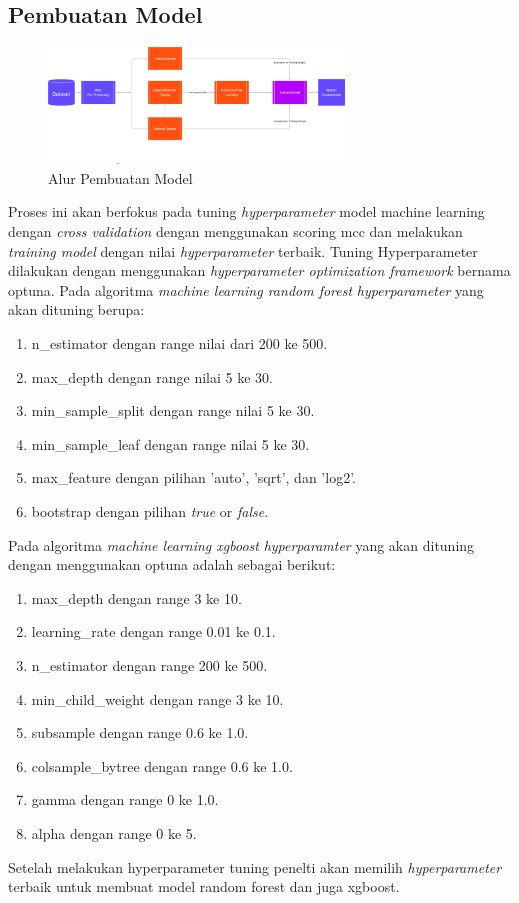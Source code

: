 \subsection{Pembuatan Model}
\begin{figure}[H]
	\centering
	\includegraphics[width=0.7\textwidth]{figure/AlurPembuatanModel.png}
	\caption{Alur Pembuatan Model}
	\label{fig:3.alur pembuatan model}
\end{figure}
Proses ini akan berfokus pada tuning \textit{hyperparameter} model machine learning dengan \textit{cross validation} dengan menggunakan scoring mcc dan melakukan \textit{training model} dengan nilai \textit{hyperparameter} terbaik. Tuning Hyperparameter dilakukan dengan menggunakan \textit{hyperparameter optimization framework} bernama optuna. Pada algoritma \textit{machine learning random forest} \textit{hyperparameter} yang akan dituning berupa\cite{albahli2024efficient}:
\begin{enumerate}[noitemsep]
    \item n\_estimator dengan range nilai dari 200 ke 500.
    \item max\_depth dengan range nilai 5 ke 30.
    \item min\_sample\_split dengan range nilai 5 ke 30.
    \item min\_sample\_leaf dengan range nilai 5 ke 30.
    \item max\_feature dengan pilihan 'auto', 'sqrt', dan 'log2'.
    \item bootstrap dengan pilihan \textit{true} or \textit{false}.
\end{enumerate}
Pada algoritma \textit{machine learning xgboost} \textit{hyperparamter} yang akan dituning dengan menggunakan optuna adalah sebagai berikut\cite{Verma2024ExploringKX}:
\begin{enumerate}[noitemsep]
    \item max\_depth dengan range 3 ke 10.
    \item learning\_rate dengan range 0.01 ke 0.1.
    \item n\_estimator dengan range 200 ke 500.
    \item min\_child\_weight dengan range 3 ke 10.
    \item subsample dengan range 0.6 ke 1.0.
    \item colsample\_bytree dengan range 0.6 ke 1.0.
    \item gamma dengan range 0 ke 1.0.
    \item alpha dengan range 0 ke 5.
\end{enumerate}
Setelah melakukan hyperparameter tuning penelti akan memilih \textit{hyperparameter} terbaik untuk membuat model random forest dan juga xgboost.

